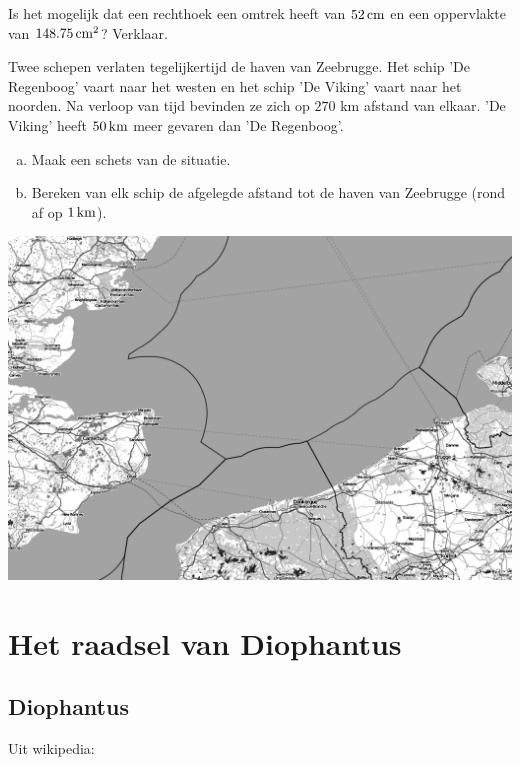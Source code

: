 \documentclass[12pt]{article}
\begin{document}
\begin{oefening}
Is het mogelijk dat een rechthoek een omtrek heeft van $52 \cm$ en een oppervlakte van $148.75\cm^2$? Verklaar.
\end{oefening}


\begin{oefening}
Twee schepen verlaten tegelijkertijd de haven van Zeebrugge. Het schip 'De Regenboog' vaart naar het westen en het schip 'De Viking' vaart naar het noorden. Na verloop van tijd bevinden ze zich op $270$ km afstand van elkaar. 'De Viking' heeft $50 \km$ meer gevaren dan 'De Regenboog'.
\begin{enumerate}[(a)]
  \item Maak een schets van de situatie.
  \item Bereken van elk schip de afgelegde afstand tot de haven van Zeebrugge (rond af op $1 \km$).
\end{enumerate}
\begin{center}
\includegraphics[width=\textwidth]{zeebrugge}
\end{center}
\end{oefening}

\pagebreak

\section*{Het raadsel van Diophantus}

\subsection*{Diophantus}

Uit wikipedia:
\end{document}
